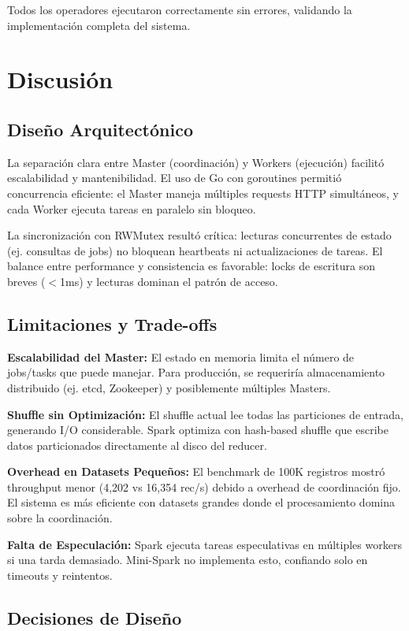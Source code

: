 \documentclass[conference]{IEEEtran}
\begin{document}
Todos los operadores ejecutaron correctamente sin errores, validando la implementación completa del sistema.

\section{Discusión}\label{sec:discusion}

\subsection{Diseño Arquitectónico}

La separación clara entre Master (coordinación) y Workers (ejecución) facilitó escalabilidad y mantenibilidad. El uso de Go con goroutines permitió concurrencia eficiente: el Master maneja múltiples requests HTTP simultáneos, y cada Worker ejecuta tareas en paralelo sin bloqueo.

La sincronización con RWMutex resultó crítica: lecturas concurrentes de estado (ej. consultas de jobs) no bloquean heartbeats ni actualizaciones de tareas. El balance entre performance y consistencia es favorable: locks de escritura son breves ($<$1ms) y lecturas dominan el patrón de acceso.

\subsection{Limitaciones y Trade-offs}

\textbf{Escalabilidad del Master:} El estado en memoria limita el número de jobs/tasks que puede manejar. Para producción, se requeriría almacenamiento distribuido (ej. etcd, Zookeeper) y posiblemente múltiples Masters.

\textbf{Shuffle sin Optimización:} El shuffle actual lee todas las particiones de entrada, generando I/O considerable. Spark optimiza con hash-based shuffle que escribe datos particionados directamente al disco del reducer.

\textbf{Overhead en Datasets Pequeños:} El benchmark de 100K registros mostró throughput menor (4,202 vs 16,354 rec/s) debido a overhead de coordinación fijo. El sistema es más eficiente con datasets grandes donde el procesamiento domina sobre la coordinación.

\textbf{Falta de Especulación:} Spark ejecuta tareas especulativas en múltiples workers si una tarda demasiado. Mini-Spark no implementa esto, confiando solo en timeouts y reintentos.

\subsection{Decisiones de Diseño}
\end{document}
